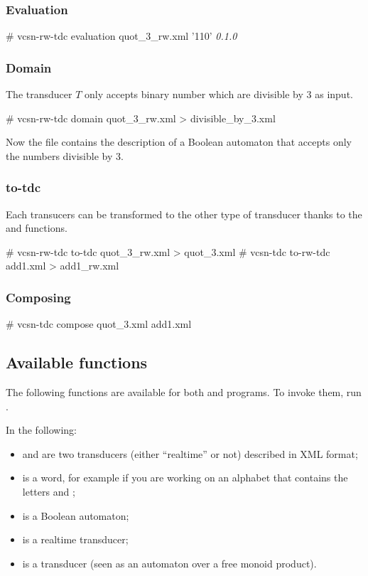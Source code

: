 \subsubsection{Evaluation}

\begin{shell}
# vcsn-rw-tdc evaluation quot_3_rw.xml '110'
\textit{0.1.0}
\end{shell}

\subsubsection{Domain}
The transducer $T$ only accepts binary number which are divisible by 3
as input.
\begin{shell}
# vcsn-rw-tdc domain quot_3_rw.xml > divisible_by_3.xml
\end{shell}
Now the file  contains the description of a
Boolean automaton that accepts only the numbers divisible by 3.

\subsubsection{to-tdc}
Each transucers can be transformed to the other type of transducer
thanks to the  and  functions.
\begin{shell}
# vcsn-rw-tdc to-tdc quot_3_rw.xml > quot_3.xml
# vcsn-tdc to-rw-tdc add1.xml > add1_rw.xml
\end{shell}

\subsubsection{Composing}
\begin{shell}
# vcsn-tdc compose quot_3.xml add1.xml
\end{shell}

\subsection{Available functions}
The following functions are available for both 
and  programs.  To invoke them, run
.

\smallskip

In the following:

\begin{itemize}
\item {} and  are two transducers (either ``realtime''
  or not) described in \Vauc XML format;
\item {} is a word, for example  if you are working
  on an alphabet that contains the letters  and ;
\item {} is a Boolean automaton;
\item {} is a realtime transducer;
\item {} is a transducer (seen as an automaton over a free
  monoid product).
\end{itemize}

